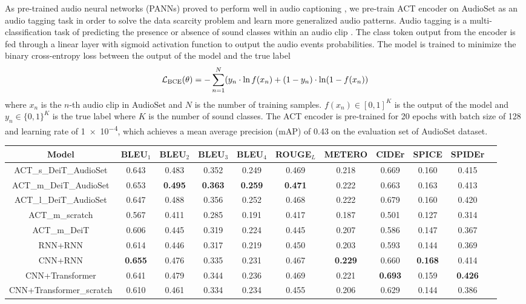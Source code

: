 \documentclass{article}
\begin{document}
\begin{sloppy}
As pre-trained audio neural networks (PANNs) proved to perform well in audio captioning \cite{xinhao2021_t6}, we pre-train ACT encoder on AudioSet as an audio tagging task in order to solve the data scarcity problem and learn more generalized audio patterns. Audio tagging is a multi-classification task of predicting the presence or absence of sound classes within an audio clip \cite{kong2019weakly}. The class token output from the encoder is fed through a linear layer with sigmoid activation function to output the audio events probabilities. The model is trained to minimize the binary cross-entropy loss between the output of the model and the true label
\begin{equation}
  \label{eqn:at_loss}
  \mathcal L_{\rm BCE}(\theta) = - \sum_{n=1}^N (y_n \cdot \ln f(x_n) + (1-y_n)\cdot \ln (1-f(x_n))
\end{equation}
where $x_n$ is the $n$-th audio clip in AudioSet and $N$ is the number of training samples. $f(x_n) \in [0,1]^K$ is the output of the model and $y_n \in \{0,1\}^K$ is the true label where $K$ is the number of sound classes. The ACT encoder is pre-trained for \num{20} epochs with batch size of \num{128} and learning rate of \num{1e-4}, which achieves a mean average precision (mAP) of \num{0.43} on the evaluation set of AudioSet dataset. 
\begin{table*}[ht]
\centering
\begin{tabular}[\linewidth]{c c c c c c c c c c c} 
 \hline
 Model & BLEU$_{1}$ & BLEU$_{2}$ & BLEU$_{3}$ & BLEU$_{4}$ & ROUGE$_{L}$ & METERO & CIDEr & SPICE & SPIDEr \\ 
 \hline
 ACT\_s\_DeiT\_AudioSet & 0.643 & 0.483 & 0.352 & 0.249 & 0.469 & 0.218 & 0.669 & 0.160 & 0.415 \\
 ACT\_m\_DeiT\_AudioSet & 0.653 & \textbf{0.495} & \textbf{0.363} & \textbf{0.259} & \textbf{0.471} & 0.222 & 0.663 & 0.163 & 0.413 \\
 ACT\_l\_DeiT\_AudioSet & 0.647 & 0.488 & 0.356 & 0.252 & 0.468 & 0.222 & 0.679 & 0.160 & 0.420 \\
 \hline
 ACT\_m\_scratch & 0.567 & 0.411 & 0.285 & 0.191 & 0.417 & 0.187 & 0.501 & 0.127 & 0.314 \\
 ACT\_m\_DeiT & 0.606 & 0.445 & 0.319 & 0.224 & 0.445 & 0.207 & 0.586 & 0.147 & 0.367 \\
\hline
 RNN+RNN \cite{kim2019audiocaps} & 0.614 & 0.446 & 0.317 & 0.219 & 0.450 & 0.203 & 0.593 & 0.144 & 0.369 \\
 CNN+RNN \cite{xu2021investigating} & \textbf{0.655} & 0.476 & 0.335 & 0.231 & 0.467 & \textbf{0.229} & 0.660 & \textbf{0.168} & 0.414 \\
 CNN+Transformer \cite{xinhao2021_t6} & 0.641 & 0.479 & 0.344 & 0.236 & 0.469 & 0.221 & \textbf{0.693} & 0.159 & \textbf{0.426} \\
 CNN+Transformer\_scratch \cite{xinhao2021_t6} & 0.610 & 0.461 & 0.334 & 0.234 & 0.455 & 0.206 & 0.629 & 0.144 & 0.386 \\
 \hline
\end{tabular}


\end{table*}
\end{sloppy}
\end{document}
